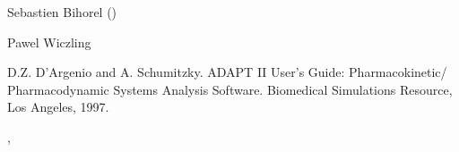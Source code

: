 %
\begin{Author}\relax
Sebastien Bihorel ()

Pawel Wiczling
\end{Author}
%
\begin{References}\relax
D.Z. D'Argenio and A. Schumitzky. ADAPT II User's Guide: Pharmacokinetic/
Pharmacodynamic Systems Analysis Software. Biomedical Simulations Resource,
Los Angeles, 1997.
\end{References}
%
\begin{SeeAlso}\relax
{}, 
\end{SeeAlso}
